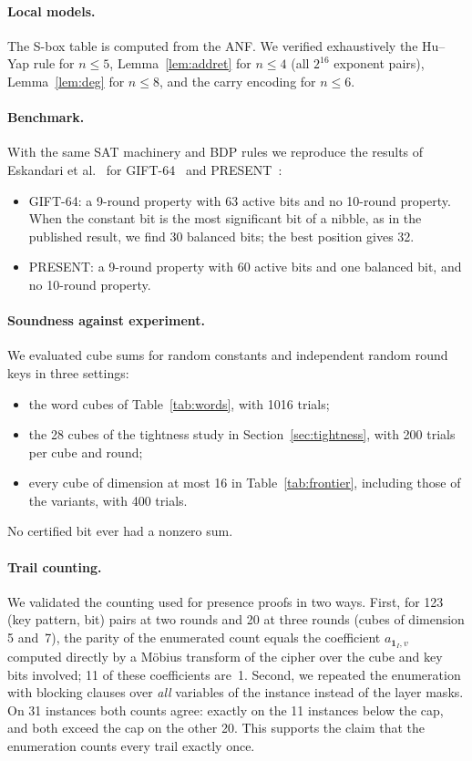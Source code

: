 \documentclass[pdflatex,sn-mathphys-num]{sn-jnl}
\theoremstyle{thmstyleone}
\theoremstyle{thmstylethree}
\theoremstyle{thmstyletwo}
\begin{document}
\paragraph{Local models.} The S-box table is computed from the ANF. We verified exhaustively the Hu--Yap rule for $n\le5$, Lemma~\ref{lem:addret} for $n\le4$ (all $2^{16}$ exponent pairs), Lemma~\ref{lem:deg} for $n\le8$, and the carry encoding for $n\le6$.

\paragraph{Benchmark.} With the same SAT machinery and BDP rules we reproduce the results of Eskandari et al.~\cite{eskandari2018} for GIFT-64~\cite{gift2017} and PRESENT~\cite{present2007}:
\begin{itemize}
\item GIFT-64: a 9-round property with 63 active bits and no 10-round property. When the constant bit is the most significant bit of a nibble, as in the published result, we find 30 balanced bits; the best position gives 32.
\item PRESENT: a 9-round property with 60 active bits and one balanced bit, and no 10-round property.
\end{itemize}

\paragraph{Soundness against experiment.} We evaluated cube sums for random constants and independent random round keys in three settings:
\begin{itemize}
\item the word cubes of Table~\ref{tab:words}, with 1016 trials;
\item the 28 cubes of the tightness study in Section~\ref{sec:tightness}, with 200 trials per cube and round;
\item every cube of dimension at most 16 in Table~\ref{tab:frontier}, including those of the variants, with 400 trials.
\end{itemize}
No certified bit ever had a nonzero sum.

\paragraph{Trail counting.} We validated the counting used for presence proofs in two ways. First, for 123 (key pattern, bit) pairs at two rounds and 20 at three rounds (cubes of dimension 5 and~7), the parity of the enumerated count equals the coefficient $a_{\mathbf 1_I,v}$ computed directly by a M\"obius transform of the cipher over the cube and key bits involved; 11 of these coefficients are~1. Second, we repeated the enumeration with blocking clauses over \emph{all} variables of the instance instead of the layer masks. On 31 instances both counts agree: exactly on the 11 instances below the cap, and both exceed the cap on the other 20. This supports the claim that the enumeration counts every trail exactly once.
\end{document}
